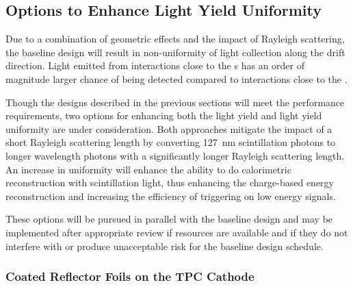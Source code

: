 
\subsection{Options to Enhance Light Yield Uniformity}
\label{sec:fdsp-pd-enh}

Due to a combination of geometric effects and the impact of Rayleigh scattering, the baseline  design will result in non-uniformity of light collection along the drift direction. Light emitted from interactions close to the s has an order of magnitude larger chance of being detected compared to interactions close to the .    

Though the designs described in the previous sections will meet the  performance requirements, %
two options for enhancing both the light yield and light yield uniformity are under consideration.  Both approaches mitigate the impact of a short Rayleigh scattering length by converting \SI{127}{nm} scintillation photons to longer wavelength photons with a significantly longer Rayleigh scattering length. %
An increase in uniformity %
will enhance the ability to do calorimetric reconstruction with scintillation light, %
thus enhancing the charge-based energy reconstruction %
and increasing the efficiency of triggering on low energy signals.

These options will be pursued in parallel with the baseline design and may be implemented after appropriate review if resources are available and if they do not interfere with or produce unacceptable risk for the baseline design schedule.



\subsubsection{Coated Reflector Foils on the TPC Cathode}
\label{sec:fdsp-pd-enh-cathode}

